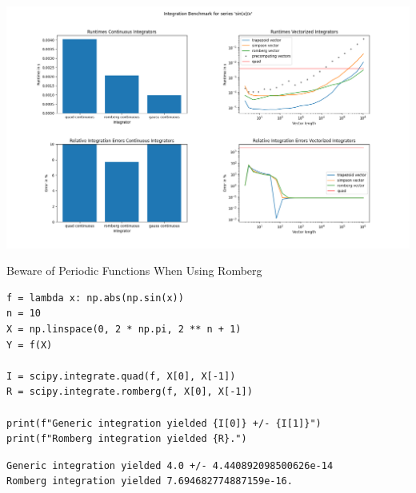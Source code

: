 \begin{frame}
%
\begin{center}
\includegraphics[width=\linewidth]{./gfx/03-timedints-3}
\end{center}
%
\end{frame}


\begin{frame}[fragile]{Beware of Periodic Functions When Using Romberg}
%
\begin{codebox}
\begin{verbatim}
f = lambda x: np.abs(np.sin(x))
n = 10
X = np.linspace(0, 2 * np.pi, 2 ** n + 1)
Y = f(X)

I = scipy.integrate.quad(f, X[0], X[-1])
R = scipy.integrate.romberg(f, X[0], X[-1])

print(f"Generic integration yielded {I[0]} +/- {I[1]}")
print(f"Romberg integration yielded {R}.")
\end{verbatim}
\end{codebox}
%
\begin{cmdbox}
\begin{verbatim}
Generic integration yielded 4.0 +/- 4.440892098500626e-14
Romberg integration yielded 7.694682774887159e-16.
\end{verbatim}
\end{cmdbox}
%
\end{frame}


